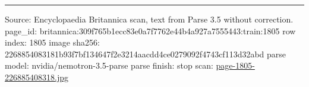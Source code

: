 \documentclass[10pt]{article}
\begin{document}
\vfill\par\noindent\rule{\linewidth}{0.4pt}\par
{\scriptsize\color{gray}\noindent Source: Encyclopaedia Britannica scan, text from Parse 3.5 without correction. page\_id: britannica:309f765b1ecc83e0a7f7762e44b4a927a7555443:train:1805 \quad row index: 1805 \quad image sha256: 2268854083181b93f7bf134647f2e3214aacdd4ce0279092f4743cf113d32abd \quad parse model: nvidia/nemotron-3.5-parse \quad parse finish: stop \quad scan: \href{../scans/page-1805-226885408318.jpg}{page-1805-226885408318.jpg}\par}
\end{document}
